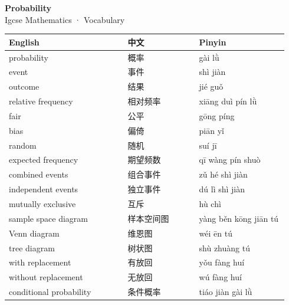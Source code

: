 \documentclass[11pt]{article}
\begin{document}
\begin{center}
  {\LARGE\bfseries Probability}\\[0.35em]
  {\large Igcse Mathematics · Vocabulary}
\end{center}
\vspace{0.6em}

\begin{longtable}{@{}p{0.40\linewidth}p{0.24\linewidth}p{0.30\linewidth}@{}}
\toprule
\textbf{English} & \textbf{中文} & \textbf{Pinyin} \\
\midrule
\endhead
\bottomrule
\endlastfoot
probability & 概率 & gài lǜ \\
event & 事件 & shì jiàn \\
outcome & 结果 & jié guǒ \\
relative frequency & 相对频率 & xiāng duì pín lǜ \\
fair & 公平 & gōng píng \\
bias & 偏倚 & piān yǐ \\
random & 随机 & suí jī \\
expected frequency & 期望频数 & qī wàng pín shuò \\
combined events & 组合事件 & zǔ hé shì jiàn \\
independent events & 独立事件 & dú lì shì jiàn \\
mutually exclusive & 互斥 & hù chì \\
sample space diagram & 样本空间图 & yàng běn kōng jiān tú \\
Venn diagram & 维恩图 & wéi ēn tú \\
tree diagram & 树状图 & shù zhuàng tú \\
with replacement & 有放回 & yǒu fàng huí \\
without replacement & 无放回 & wú fàng huí \\
conditional probability & 条件概率 & tiáo jiàn gài lǜ \\
\end{longtable}
\end{document}
